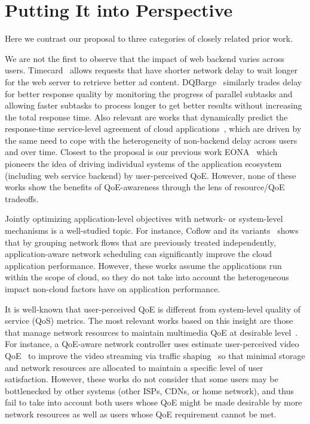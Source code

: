 \section{Putting It into Perspective}
Here we contrast our proposal to three categories of closely related prior work.

We are not the first to observe that the impact of web backend varies across users. 
Timecard~\cite{timecard} allows requests that have shorter network delay to wait longer for the web server to retrieve better ad content. 
DQBarge~\cite{dqbarge} similarly trades delay for better response quality by monitoring the progress of parallel subtasks and allowing faster subtasks to process longer to get better results without increasing the total response time.
Also relevant are works that dynamically predict the response-time service-level agreement of cloud applications~\cite{jayathilaka2015response}, which are driven by the same need to cope with the heterogeneity of non-backend delay across users and over time.
Closest to the proposal is our previous work EONA~\cite{eona} which pioneers the idea of driving individual systems of the application ecosystem (including web service backend) by user-perceived QoE.
However, none of these works show the benefits of QoE-awareness through the lens of resource/QoE tradeoffs. 

Jointly optimizing application-level objectives with network- or system-level mechanisms is a well-studied topic. 
For instance, Coflow and its variants~\cite{coflow,chowdhury2015efficient} shows that by grouping network flows that are previously treated independently, application-aware network scheduling can significantly improve the cloud application performance.
However, these works assume the applications run within the scope of cloud, so they do not take into account the heterogeneous impact non-cloud factors have on application performance.

It is well-known that user-perceived QoE is different from system-level quality of service (QoS) metrics. 
The most relevant works based on this insight are those that manage network resources to maintain multimedia QoE at desirable level~\cite{barakovic2013survey,hobfeld2012challenges,seufert2015survey}. 
For instance, a QoE-aware network controller uses estimate user-perceived video QoE~\cite{huysegems2012session} to improve the video streaming via traffic shaping~\cite{petrangeli2015network} so that minimal storage and network resources are allocated to maintain a specific level of user satisfaction.
However, these works do not consider that some users may be bottlenecked by other systems (other ISPs, CDNs, or home network), and thus fail to take into account both users whose QoE might be made desirable by more network resources as well as users whose QoE requirement cannot be met.





